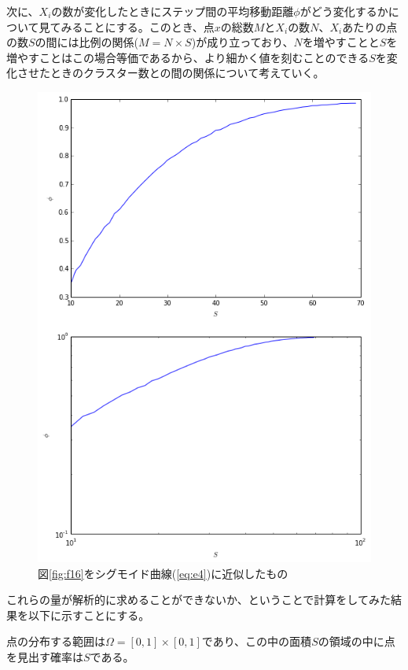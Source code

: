 次に、$X_{i}$の数が変化したときにステップ間の平均移動距離$\phi$がどう変化するかについて見てみることにする。このとき、点$x$の総数$M$と$X_{i}$の数$N$、$X_{i}$あたりの点の数$S$の間には比例の関係($M=N\times S$)が成り立っており、$N$を増やすことと$S$を増やすことはこの場合等価であるから、より細かく値を刻むことのできる$S$を変化させたときのクラスター数との間の関係について考えていく。

\begin{figure}[H]
    \begin{center}
        \includegraphics[width=12.5cm]{../img/S_phi_1.png}
        \caption{図\ref{fig:f16}をシグモイド曲線(\ref{eq:e4})に近似したもの}
        \label{fig:f19}
    \end{center}
\end{figure}

これらの量が解析的に求めることができないか、ということで計算をしてみた結果を以下に示すことにする。

点の分布する範囲は$\Omega = [0,1]\times [0,1]$であり、この中の面積$S$の領域の中に点を見出す確率は$S$である。

